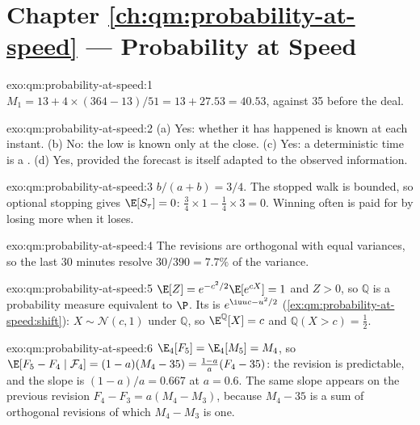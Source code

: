 \section*{Chapter \ref{ch:qm:probability-at-speed} --- Probability at Speed}

\begin{solution}{exo:qm:probability-at-speed:1}
$M_1 = 13 + 4 \times (364 - 13)/51 = 13 + 27.53 = 40.53$, against 35 before the deal.
\end{solution}

\begin{solution}{exo:qm:probability-at-speed:2}
(a) Yes: whether it has happened is known at each instant. (b) No: the low is known only at
the close. (c) Yes: a deterministic time is a . (d) Yes, provided the forecast is
itself adapted to the observed information.
\end{solution}

\begin{solution}{exo:qm:probability-at-speed:3}
$b/(a+b) = 3/4$. The stopped walk is bounded, so optional stopping gives $\E[S_\tau] = 0$:
$\tfrac34 \times 1 - \tfrac14 \times 3 = 0$. Winning often is paid for by losing more when
it loses.
\end{solution}

\begin{solution}{exo:qm:probability-at-speed:4}
The revisions are orthogonal with equal variances, so the last 30 minutes resolve $30/390 =
7.7\%$ of the variance.
\end{solution}

\begin{solution}{exo:qm:probability-at-speed:5}
$\E[Z] = e^{-c^2/2}\E[e^{cX}] = 1$ and $Z > 0$, so $\mathbb Q$ is a probability measure
equivalent to $\P$. Its  is $e^{\iu uc - u^2/2}$
(\cref{ex:qm:probability-at-speed:shift}): $X \sim \mathcal N(c,1)$ under $\mathbb Q$, so
$\E^{\mathbb Q}[X] = c$ and $\mathbb Q(X > c) = \tfrac12$.
\end{solution}

\begin{solution}{exo:qm:probability-at-speed:6}
$\E_4[F_5] = \E_4[M_5] = M_4$, so $\E[F_5 - F_4 \mid \mathcal F_4] = (1 - a)(M_4 - 35) = \frac{1 -
a}{a}(F_4 - 35)$: the revision is predictable, and the slope is $(1 - a)/a = 0.667$ at $a = 0.6$.
The same slope appears on the previous revision $F_4 - F_3 = a(M_4 - M_3)$, because $M_4 - 35$ is a
sum of orthogonal revisions of which $M_4 - M_3$ is one.
\end{solution}

